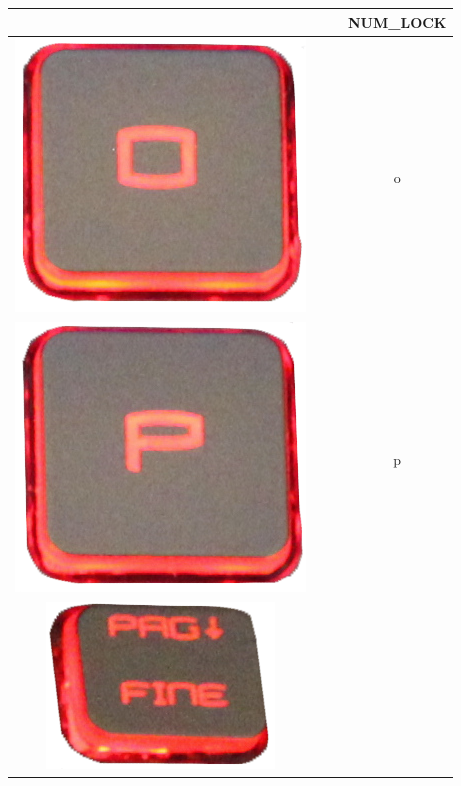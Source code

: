 \begin{longtable}{cccc}
\begin{minipage}[c]{.3\textwidth}
\vspace{0.2cm}
\end{minipage} & & & NUM\_LOCK\\
\hline
\begin{minipage}[c]{.3\textwidth}
\vspace{0.2cm}
\includegraphics[scale=0.1]{Images/KeyMapping/o}
\vspace{0.2cm}
\end{minipage} & & & o\\
\hline
\begin{minipage}[c]{.3\textwidth}
\vspace{0.2cm}
\includegraphics[scale=0.1]{Images/KeyMapping/p}
\vspace{0.2cm}
\end{minipage} & & & p\\
\hline
\begin{minipage}[c]{.3\textwidth}
\vspace{0.2cm}
\includegraphics[scale=0.1]{Images/KeyMapping/PAGE_DOWN}

\end{minipage}
\end{longtable}
